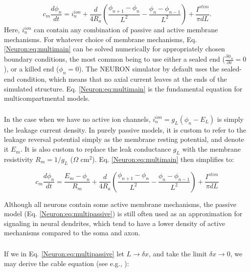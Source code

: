 \begin{equation}
c_m \frac{d\phi_n}{dt} = i_n^{ion} + \frac{d}{4R_a}\left(\frac{\phi_{n+1}-\phi_n}{L^2} - \frac{\phi_n-\phi_{n-1}}{L^2} \right) + \frac{I^{stim}}{\pi d L}.
\label{Neuron:eq:multimain}
\end{equation}
Here,  $i_n^{ion}$ can contain any combination of passive and active membrane mechanisms. For whatever choice of membrane mechanisms, Eq. \ref{Neuron:eq:multimain} can be solved numerically for appropriately chosen boundary conditions, the most common being to use either a sealed end ($\frac{\partial \phi_n}{\partial x} = 0$), or a killed end ($\phi_n=0$). The NEURON simulator by default uses the sealed-end condition, which means that no axial current leaves at the ends of the simulated structure. Eq. \ref{Neuron:eq:multimain} is the fundamental equation for multicompartmental models.


\subsubsection{}
\label{sec:Neuron:Passive_multicomp}
In the case when we have no active ion channels, $i_n^{ion} = g_L(\phi_n - E_L)$ is simply the leakage current density. In purely passive models, it is custom to refer to the leakage reversal potential simply as the membrane resting potential, and denote it $E_m$. It is also custom to replace the leak conductance $g_L$ with the membrane resistivity $R_m = 1/g_L$ ($\Omega$ cm$^2$). Eq. \ref{Neuron:eq:multimain} then simplifies to:

\begin{equation}
c_m \frac{d\phi_n}{dt} = \frac{E_m-\phi_n}{R_m} + \frac{d}{4R_a}\left(\frac{\phi_{n+1}-\phi_n}{L^2} - \frac{\phi_n-\phi_{n-1}}{L^2} \right) + \frac{I^{stim}}{\pi d L}
\label{Neuron:eq:multipassive}
\end{equation}

Although all neurons contain some active membrane mechanisms, the passive model (Eq. \ref{Neuron:eq:multipassive}) is still often used as an approximation for signaling in neural dendrites, which tend to have a lower density of active mechanisms compared to the soma and axon. 


\subsubsection{}
\label{sec:Neuron:cableeq}
If we in Eq. \ref{Neuron:eq:multipassive} let $L \rightarrow \delta x$, and take the limit $\delta x \rightarrow 0$, we may derive the cable equation (see e.g., \cite{Sterratt2011}): 

